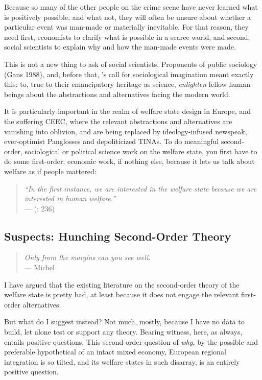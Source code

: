 \documentclass[11pt,a4paper,oneside,openright]{article}
\begin{document}
Because so many of the other people on the crime scene have never learned what is positively possible, and what not, they will often be unsure about whether a particular event was man-made or materially inevitable. 
For that reason, they need first, economists to clarify what is possible in a scarce world, and second, social scientists to explain why and how the man-made events were made.

This is not a new thing to ask of social scientists. 
Proponents of public sociology (Gans 1988), and, before that, \citeauthor{Mills-1959-aa}'s call for sociological imagination meant exactly this: 
to, true to their emancipatory heritage as science, \emph{enlighten} fellow human beings about the abstractions and alternatives facing the modern world.

It is particularly important in the realm of welfare state design in Europe, and the suffering \gls{CEEC}, where the relevant abstractions and alternatives are vanishing into oblivion, and are being replaced by ideology-infused newspeak, ever-optimist Panglosses and depoliticized TINAs. 
To do meaningful second-order, sociological or political science work on the welfare state, you first have to do some first-order, economic work, if nothing else, because it lets us talk about welfare as if people mattered:
\begin{quote}
	\emph{``In the first instance, we are interested in the welfare state because we are interested in human welfare.''}\\
	--- \citeauthor{Haggard2009} (\citeyear{Haggard2009}: 236) 
\end{quote}

\subsection[Suspects]{Suspects: Hunching Second-Order Theory}

\begin{quote}
	\emph{Only from the margins can you see well.}\\
	--- Michel \cite{Foucault-1972-aa} 
\end{quote}

I have argued that the existing literature on the second-order theory of the welfare state is pretty bad, at least because it does not engage the relevant first-order alternatives. 

But what do I suggest instead? 
Not much, mostly, because I have no data to build, let alone test or support any theory. 
Bearing witness, here, as always, entails positive questions. 
This second-order question of \emph{why}, by the possible and preferable hypothetical of an intact mixed economy, European regional integration is so tilted, and its welfare states in such disarray, is an entirely positive question.
\end{document}
